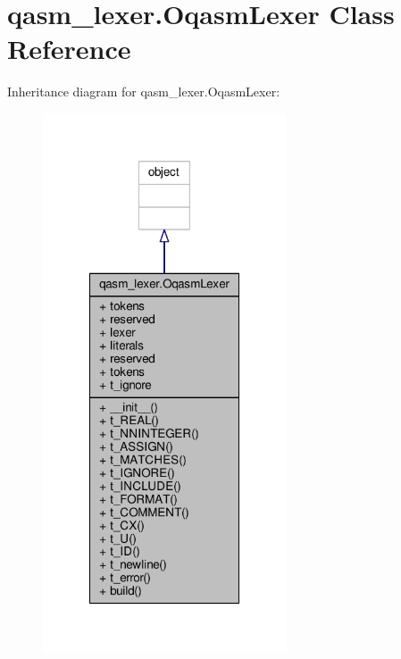 \hypertarget{classqasm__lexer_1_1OqasmLexer}{\section{qasm\-\_\-lexer.\-Oqasm\-Lexer Class Reference}
\label{classqasm__lexer_1_1OqasmLexer}
}


Inheritance diagram for qasm\-\_\-lexer.\-Oqasm\-Lexer\-:
\nopagebreak
\begin{figure}[H]
\begin{center}
\leavevmode
\includegraphics[width=204pt]{de/df5/classqasm__lexer_1_1OqasmLexer__inherit__graph}
\end{center}
\end{figure}


